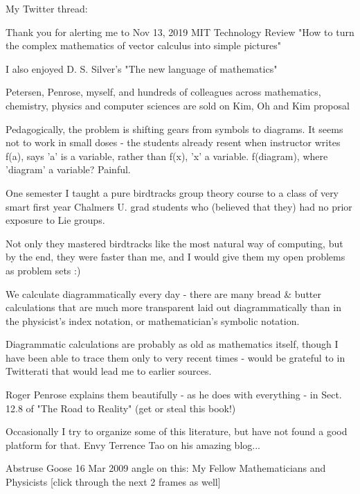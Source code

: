 \begin{description}
My Twitter thread:

Thank you for alerting me to Nov 13, 2019 MIT Technology Review "How to
turn the complex mathematics of vector calculus into simple pictures"

I also enjoyed D. S. Silver's "The new language of mathematics"

Petersen, Penrose, myself, and hundreds of colleagues across mathematics, chemistry, physics and computer sciences are sold on Kim, Oh and Kim proposal

Pedagogically, the problem is shifting gears from symbols to diagrams. It seems not to work in small doses - the students already resent when instructor writes f(a), says 'a' is a variable, rather than f(x), 'x' a variable. f(diagram), where 'diagram' a variable?
Painful.

One semester I taught a pure birdtracks group theory course to a class of very smart first year Chalmers U. grad students who (believed that they) had no prior exposure to Lie groups.

Not only they mastered birdtracks like the most natural way of computing, but by the end, they were faster than me, and I would give them my open problems as problem sets :)

We calculate diagrammatically every day - there are many bread \& butter calculations that are much more transparent laid out diagrammatically than in the physicist's index notation, or mathematician's symbolic notation.

Diagrammatic calculations are probably as old as mathematics itself, though I have been able to trace them only to very recent times - would be grateful to in Twitterati that would lead me to earlier sources.

Roger Penrose explains them beautifully - as he does with everything - in Sect. 12.8 of "The Road to Reality" (get or steal this book!)

Occasionally I try to organize some of this literature, but have not found a good platform for that. Envy Terrence Tao on his amazing blog...

Abstruse Goose 16 Mar 2009 angle on this:
My Fellow Mathematicians and Physicists
    [click through the next 2 frames as well]


\end{description}
